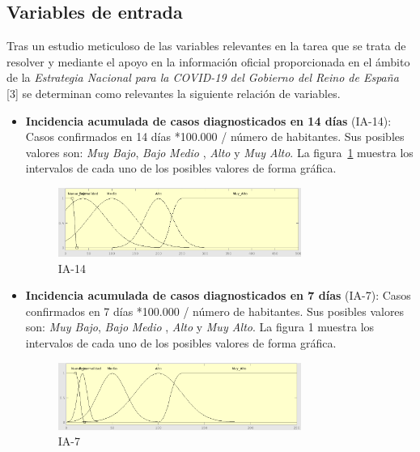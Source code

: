 \documentclass[12pt,a4paper, xcolor=table]{article}
\begin{document}
\subsection{Variables de entrada}
Tras un estudio meticuloso de las variables relevantes en la tarea que se trata de resolver y mediante el apoyo en la información oficial proporcionada en el ámbito de la \textit{Estrategia Nacional para la COVID-19 del Gobierno del Reino de España} [3] se determinan como relevantes la siguiente relación de variables.

\begin{itemize}

    \item \textbf{Incidencia acumulada de casos diagnosticados en 14 días} (IA-14): Casos confirmados en 14 días *100.000 / número de habitantes. Sus posibles valores son: \textit{Muy Bajo}, \textit{Bajo} \textit{Medio }, {\textit{Alto}} y {\textit{Muy Alto}}. La figura~\ref{IA-14} muestra los intervalos de cada uno de los posibles valores de forma gráfica.

    \begin{figure}[!h]
      \centering
      \includegraphics[width=300px]{img/ia_ac_14.png}
      \caption{IA-14}
      \label{IA-14}
    \end{figure}

    \item \textbf{Incidencia acumulada de casos diagnosticados en 7 días} (IA-7): Casos confirmados en 7 días *100.000 / número de habitantes. Sus posibles valores son: \textit{Muy Bajo}, \textit{Bajo} \textit{Medio }, {\textit{Alto}} y {\textit{Muy Alto}}. La figura 1 muestra los intervalos de cada uno de los posibles valores de forma gráfica.
    
    \begin{figure}[!h]
      \centering
      \includegraphics[width=300px]{img/ia_ac_7.png}
      \caption{IA-7}
      \label{IA-7}
    \end{figure}


\end{itemize}
\end{document}
